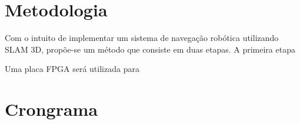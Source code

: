 	\chapter{Metodologia}\label{cap-metodologia}

	Com o intuito de implementar um sistema de navegação robótica utilizando SLAM 3D, propõe-se um método que consiste em duas etapas. A primeira etapa 
	
	
	Uma placa FPGA será utilizada para 
	
	
	\chapter{Crongrama}\label{cap-cronograma}
	
	